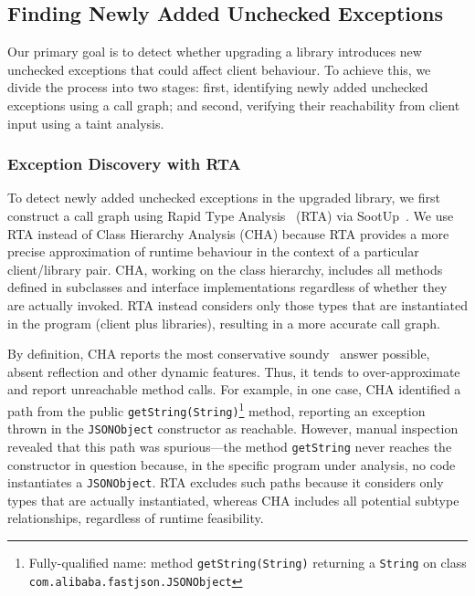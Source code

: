 \subsection{Finding Newly Added Unchecked Exceptions}

Our primary goal is to detect whether upgrading a library introduces new unchecked exceptions that could affect client behaviour. To achieve this, we divide the process into two stages: first, identifying newly added unchecked exceptions using a call graph; and second, verifying their reachability from client input using a taint analysis.

\subsubsection{Exception Discovery with RTA}

To detect newly added unchecked exceptions in the upgraded library, we first construct a call graph using Rapid Type Analysis~\cite{bacon96:_fast_static_analy_c_virtual_funct_calls} (RTA) via SootUp~\cite{Karakaya24:_sootup}. We use RTA instead of Class Hierarchy Analysis (CHA) because RTA provides a more precise approximation of runtime behaviour in the context of a particular client/library pair. CHA, working on the class hierarchy, includes all methods defined in subclasses and interface implementations regardless of whether they are actually invoked. RTA instead considers only those types that are instantiated in the program (client plus libraries), resulting in a more accurate call graph.

By definition, CHA reports the most conservative soundy~\cite{livshits15:_in} answer possible, absent reflection and other dynamic features. Thus, it tends to over-approximate and report unreachable method calls. For example, in one case, CHA identified a path from the public \texttt{getString(String)}\footnote{Fully-qualified name: method \texttt{getString(String)} returning a \texttt{String} on class \texttt{com.alibaba.fastjson.JSONObject}} method, reporting an exception thrown in the \texttt{JSONObject} constructor as reachable. However, manual inspection revealed that this path was spurious—the method \texttt{getString} never reaches the constructor in question because, in the specific program under analysis, no code instantiates a \texttt{JSONObject}. RTA excludes such paths because it considers only types that are actually instantiated, whereas CHA includes all potential subtype relationships, regardless of runtime feasibility.


